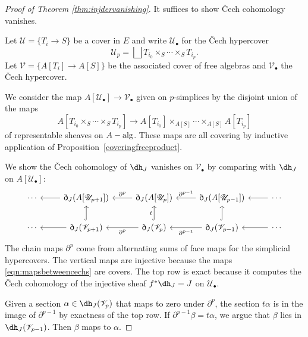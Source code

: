 \documentclass[11pt,reqno]{amsart}
\theoremstyle{definition}
\newcommand{\dd}[1]{\dh_{#1}}
\newcommand{\scr}[1]{{\ensuremath{\mathscr{#1}}}}
\newcommand{\Aalg}{A-{\rm alg}}
\begin{document}
\begin{proof}[Proof of Theorem \ref{thm:injdervanishing}]

It suffices to show \v Cech cohomology vanishes. 


Let $\scr U = \{T_i \to S\}$ be a cover in $E$ and write $\scr U_\bullet$ for the \v Cech hypercover
\[\scr U_p = \bigsqcup T_{i_0} \times_S \cdots \times_S T_{i_p}.\]
Let $\scr V = \{A[T_i] \to A[S]\}$ be the associated cover of free algebras and $\scr V_\bullet$ the \v Cech hypercover. 

We consider the map $A[\scr U_\bullet] \to \scr V_\bullet$ given on $p$-simplices by the disjoint union of the maps
\begin{equation}\label{eqn:mapsbetweencechs}
A[T_{i_0} \times_S \cdots \times_S T_{i_p}] \longrightarrow A[T_{i_0}] \times_{A[S]} \cdots \times_{A[S]} A[T_{i_p}]    
\end{equation}
	of representable sheaves on $\Aalg$.  These maps are all covering by inductive application of Proposition~\ref{coveringfreeproduct}.

We show the \v Cech cohomology of $\dd{J}$ vanishes on $\scr V_\bullet$ by comparing with $\dd{J}$ on $A[\scr U_\bullet]$:
\begin{equation}\label{eqn:cechcomparison}
\begin{tikzcd}
\cdots &\dd{J}(A[\scr U_{p+1}]) \ar[l]     &\dd{J}(A[\scr U_{p}]) \ar[l, "\partial^p", swap]   &\dd{J}(A[\scr U_{p-1}]) \ar[l, "\partial^{p-1}", swap]    &\cdots \ar[l]       \\
\cdots &\dd{J}(\scr V_{p+1}) \ar[u, hook] \ar[l]       &\dd{J}(\scr V_{p}) \ar[u, hook, "t"] \ar[l, "\partial^p"]       &\dd{J}(\scr V_{p-1}) \ar[u, hook] \ar[l, "\partial^{p-1}"]       &\cdots \ar[l]
\end{tikzcd}    
\end{equation}
The chain maps $\partial^p$ come from alternating sums of face maps for the simplicial hypercovers. The vertical maps are injective because the maps \eqref{eqn:mapsbetweencechs} are covers. The top row is exact because it computes the \v Cech cohomology of the injective sheaf $f^* \dd{J} = J$ on $\scr U_\bullet$. 

Given a section $\alpha \in \dd{J}(\scr V_p)$ that maps to zero under $\partial^p$, the section $t \alpha$ is in the image of $\partial^{p-1}$ by exactness of the top row. If $\partial^{p-1} \beta = t \alpha$, we argue that $\beta$ lies in $\dd{J}(\scr V_{p-1})$. Then $\beta$ maps to $\alpha$. 









\end{proof}
\end{document}
